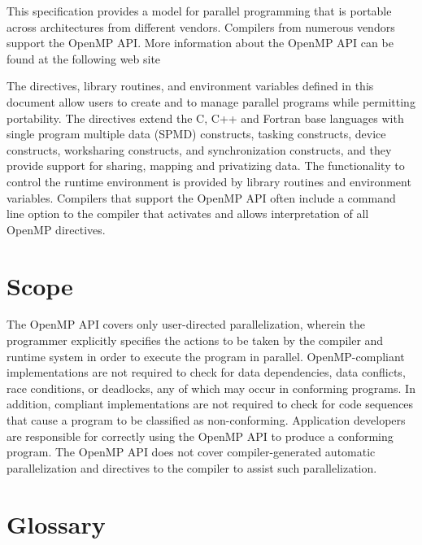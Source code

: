 This specification provides a model for parallel programming that is portable
across architectures from different vendors. Compilers from numerous vendors
support the OpenMP API. More information about the OpenMP API can be found at
the following web site


The directives, library routines, and environment variables defined in this document 
allow users to create and to manage parallel programs while permitting portability. The 
directives extend the C, C++ and Fortran base languages with single program multiple 
data (SPMD) constructs, tasking constructs, device constructs, worksharing constructs, 
and synchronization constructs, and they provide support for sharing, mapping and privatizing 
data. The functionality to control the runtime environment is provided by library 
routines and environment variables. Compilers that support the OpenMP API often 
include a command line option to the compiler that activates and allows interpretation of 
all OpenMP directives.







\section{Scope}
\label{sec:Scope}
The OpenMP API covers only user-directed parallelization, wherein the programmer 
explicitly specifies the actions to be taken by the compiler and runtime system in order 
to execute the program in parallel. OpenMP-compliant implementations are not required 
to check for data dependencies, data conflicts, race conditions, or deadlocks, any of 
which may occur in conforming programs. In addition, compliant implementations are 
not required to check for code sequences that cause a program to be classified as 
non-conforming. Application developers are responsible for correctly using the OpenMP API 
to produce a conforming program. The OpenMP API does not cover compiler-generated 
automatic parallelization and directives to the compiler to assist such parallelization.







\section{Glossary}
\label{sec:Glossary}

